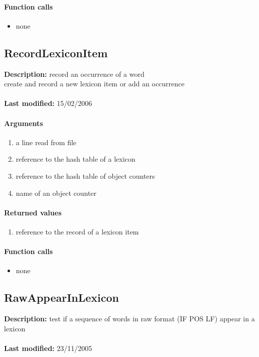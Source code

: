 \paragraph{Function calls}
\begin{itemize}
\item none
\end{itemize}

\subsection{RecordLexiconItem}
\textbf{Description:} record an occurrence of a word\\
create and record a new lexicon item or add an occurrence\\
\\\textbf{Last modified:} 15/02/2006

\paragraph{Arguments}
\begin{enumerate}
\item a line read from file
\item reference to the hash table of a lexicon
\item reference to the hash table of object counters
\item name of an object counter
\end{enumerate}

\paragraph{Returned values}
\begin{enumerate}
\item reference to the record of a lexicon item
\end{enumerate}

\paragraph{Function calls}
\begin{itemize}
\item none
\end{itemize}

\subsection{RawAppearInLexicon}
\textbf{Description:} test if a sequence of  words in raw format (IF	POS	LF) appear in a lexicon\\
\\\textbf{Last modified:} 23/11/2005

